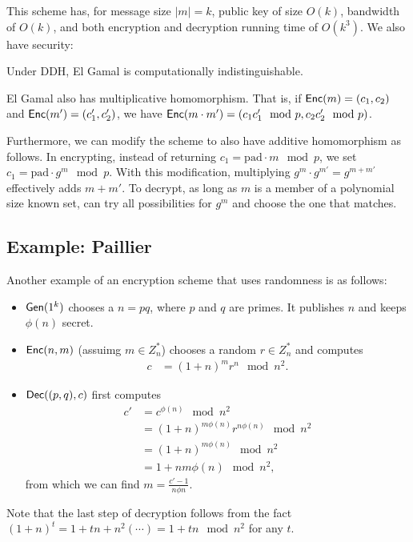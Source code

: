 \documentclass[10pt]{article}
\begin{document}
This scheme has, for message size $|m| = k$, public key of size $O(k)$, bandwidth of $O(k)$, and both encryption and decryption running time of $O(k^3)$. We also have security:
\begin{theorem}
Under DDH, El Gamal is computationally indistinguishable.
\end{theorem}

El Gamal also has multiplicative homomorphism. That is, if $\mathsf{Enc}(m) = (c_1, c_2)$ and $\mathsf{Enc}(m') = (c_1', c_2')$, we have $\mathsf{Enc}(m \cdot m') = (c_1c_1' \mod p, c_2c_2' \mod p)$. 

Furthermore, we can modify the scheme to also have additive homomorphism as follows. In encrypting, instead of returning $c_1 = \text{pad} \cdot m \mod p$, we set $c_1 = \text{pad} \cdot g^m \mod p$. With this modification, multiplying $g^m \cdot g^{m'} = g^{m+m'}$ effectively adds $m+m'$. To decrypt, as long as $m$ is a member of a polynomial size known set, can try all possibilities for $g^m$ and choose the one that matches.

\subsection{Example: Paillier}

Another example of an encryption scheme that uses randomness is as follows:

\begin{itemize}
	\item $\mathsf{Gen}(1^k)$ chooses a $n=pq$, where $p$ and $q$ are primes. It publishes $n$ and keeps $\phi(n)$ secret.
	\item $\mathsf{Enc}(n,m)$ (assuimg $m \in Z_n^*$) chooses a random $r \in Z_n^*$ and computes
	\begin{align*}
	c &= (1+n)^mr^n \mod n^2.
	\end{align*}
	\item $\mathsf{Dec}((p,q),c)$ first computes
	\begin{align*}
	c' &= c^{\phi(n)} \mod n^2 \\
	&= (1+n)^{m \phi(n)} r^{n \phi(n)} \mod n^2 \\
	&= (1+n)^{m \phi(n)} \mod n^2 \\
	&= 1+nm \phi(n) \mod n^2,
	\end{align*}
	from which we can find $m = \frac{c'-1}{n \phi n}$.
\end{itemize}
Note that the last step of decryption follows from the fact $(1+n)^t = 1 + tn + n^2 ( \cdots ) = 1+tn \mod n^2$ for any $t$.
\end{document}
